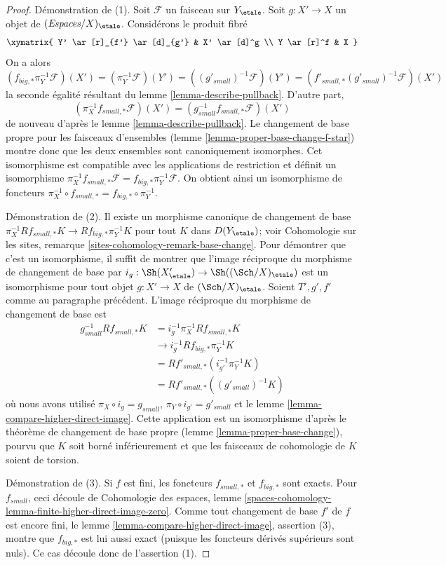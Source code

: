 \begin{proof}
Démonstration de (1). Soit $\mathcal{F}$ un faisceau sur $Y_\etale$.
Soit $g : X' \to X$ un objet de $(\textit{Espaces}/X)_\etale$.
Considérons le produit fibré
$$
\xymatrix{
Y' \ar[r]_{f'} \ar[d]_{g'} & X' \ar[d]^g \\
Y \ar[r]^f & X
}
$$
On a alors
$$
(f_{big, *}\pi_Y^{-1}\mathcal{F})(X') =
(\pi_Y^{-1}\mathcal{F})(Y') =
((g'_{small})^{-1}\mathcal{F})(Y')  =
(f'_{small, *}(g'_{small})^{-1}\mathcal{F})(X')
$$
la seconde égalité résultant du lemme \ref{lemma-describe-pullback}.
D'autre part,
$$
(\pi_X^{-1}f_{small, *}\mathcal{F})(X') =
(g_{small}^{-1}f_{small, *}\mathcal{F})(X')
$$
de nouveau d'après le lemme \ref{lemma-describe-pullback}.
Le changement de base propre pour les faisceaux d'ensembles
(lemme \ref{lemma-proper-base-change-f-star}) montre donc que les deux
ensembles sont canoniquement isomorphes. Cet isomorphisme est compatible
avec les applications de restriction et définit un isomorphisme
$\pi_X^{-1}f_{small, *}\mathcal{F} = f_{big, *}\pi_Y^{-1}\mathcal{F}$.
On obtient ainsi un isomorphisme de foncteurs
$\pi_X^{-1} \circ f_{small, *} = f_{big, *} \circ \pi_Y^{-1}$.

\medskip\noindent
Démonstration de (2). Il existe un morphisme canonique de changement de base
$\pi_X^{-1}Rf_{small, *}K \to Rf_{big, *}\pi_Y^{-1}K$
pour tout $K$ dans $D(Y_\etale)$; voir Cohomologie sur les sites, remarque
\ref{sites-cohomology-remark-base-change}.
Pour démontrer que c'est un isomorphisme, il suffit de montrer que l'image
réciproque du morphisme de changement de base par
$i_g : \Sh(X'_\etale) \to \Sh((\Sch/X)_\etale)$ est un isomorphisme pour tout
objet $g : X' \to X$ de $(\Sch/X)_\etale$.
Soient $T', g', f'$ comme au paragraphe précédent.
L'image réciproque du morphisme de changement de base est
\begin{align*}
g_{small}^{-1}Rf_{small, *}K
& =
i_g^{-1}\pi_X^{-1}Rf_{small, *}K \\
& \to
i_g^{-1}Rf_{big, *}\pi_Y^{-1}K \\
& =
Rf'_{small, *}(i_{g'}^{-1}\pi_Y^{-1}K) \\
& =
Rf'_{small, *}((g'_{small})^{-1}K)
\end{align*}
où nous avons utilisé $\pi_X \circ i_g = g_{small}$,
$\pi_Y \circ i_{g'} = g'_{small}$ et le lemme
\ref{lemma-compare-higher-direct-image}.
Cette application est un isomorphisme d'après le théorème de changement de base
propre (lemme \ref{lemma-proper-base-change}), pourvu que $K$ soit borné
inférieurement et que les faisceaux de cohomologie de $K$ soient de torsion.

\medskip\noindent
Démonstration de (3). Si $f$ est fini, les foncteurs
$f_{small, *}$ et $f_{big, *}$ sont exacts. Pour $f_{small}$, ceci découle de
Cohomologie des espaces, lemme
\ref{spaces-cohomology-lemma-finite-higher-direct-image-zero}.
Comme tout changement de base $f'$ de $f$ est encore fini, le lemme
\ref{lemma-compare-higher-direct-image}, assertion (3), montre que
$f_{big, *}$ est lui aussi exact (puisque les foncteurs dérivés supérieurs
sont nuls). Ce cas découle donc de l'assertion (1).
\end{proof}
